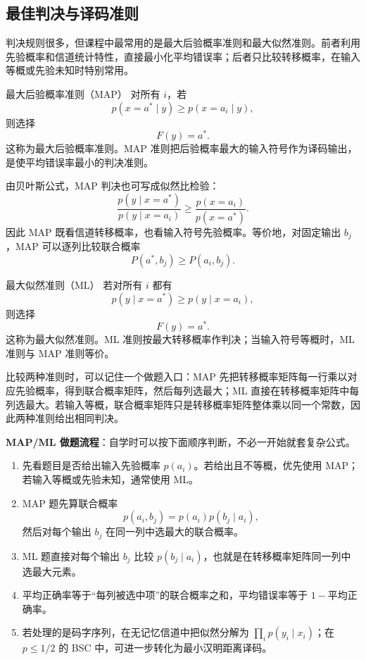 \subsection{最佳判决与译码准则}

判决规则很多，但课程中最常用的是最大后验概率准则和最大似然准则。前者利用先验概率和信道统计特性，直接最小化平均错误率；后者只比较转移概率，在输入等概或先验未知时特别常用。

\begin{definitionBox}{最大后验概率准则（MAP）}
对所有 $i$，若
\[
p(x=a^*\mid y)\ge p(x=a_i\mid y),
\]
则选择
\[
F(y)=a^*.
\]
这称为最大后验概率准则。MAP 准则把后验概率最大的输入符号作为译码输出，是使平均错误率最小的判决准则。
\end{definitionBox}

由贝叶斯公式，MAP 判决也可写成似然比检验：
\[
\frac{p(y\mid x=a^*)}{p(y\mid x=a_i)}
\ge
\frac{p(x=a_i)}{p(x=a^*)}.
\]
因此 MAP 既看信道转移概率，也看输入符号先验概率。等价地，对固定输出 $b_j$，MAP 可以逐列比较联合概率
\[
P(a^*,b_j)\ge P(a_i,b_j).
\]

\begin{definitionBox}{最大似然准则（ML）}
若对所有 $i$ 都有
\[
p(y\mid x=a^*)\ge p(y\mid x=a_i),
\]
则选择
\[
F(y)=a^*.
\]
这称为最大似然准则。ML 准则按最大转移概率作判决；当输入符号等概时，ML 准则与 MAP 准则等价。
\end{definitionBox}

比较两种准则时，可以记住一个做题入口：MAP 先把转移概率矩阵每一行乘以对应先验概率，得到联合概率矩阵，然后每列选最大；ML 直接在转移概率矩阵中每列选最大。若输入等概，联合概率矩阵只是转移概率矩阵整体乘以同一个常数，因此两种准则给出相同判决。

\textbf{MAP/ML 做题流程}：自学时可以按下面顺序判断，不必一开始就套复杂公式。
\begin{enumerate}
  \item 先看题目是否给出输入先验概率 $p(a_i)$。若给出且不等概，优先使用 MAP；若输入等概或先验未知，通常使用 ML。
  \item MAP 题先算联合概率
  \[
  p(a_i,b_j)=p(a_i)p(b_j\mid a_i),
  \]
  然后对每个输出 $b_j$ 在同一列中选最大的联合概率。
  \item ML 题直接对每个输出 $b_j$ 比较 $p(b_j\mid a_i)$，也就是在转移概率矩阵同一列中选最大元素。
  \item 平均正确率等于“每列被选中项”的联合概率之和，平均错误率等于 $1-$平均正确率。
  \item 若处理的是码字序列，在无记忆信道中把似然分解为 $\prod_i p(y_i\mid x_i)$；在 $p\le1/2$ 的 BSC 中，可进一步转化为最小汉明距离译码。
\end{enumerate}

